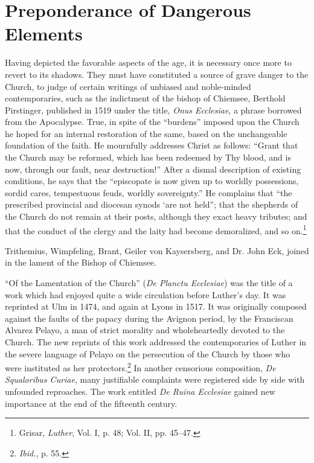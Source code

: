 \section{Preponderance of Dangerous Elements}

Having depicted the favorable aspects of the age, it is necessary
once more to revert to its shadows. They must have constituted a
source of grave danger to the Church, to judge of certain writings
of unbiased and noble-minded contemporaries, such as the indictment of
the bishop of Chiemsee, Berthold Pirstinger, published in
1519 under the title, \textit{Onus Ecclesiae}, a phrase borrowed from the
Apocalypse. True, in spite of the “burdens” imposed upon the Church
he hoped for an internal restoration of the same, based on the unchangeable
foundation of the faith. He mournfully addresses Christ
as follows: “Grant that the Church may be reformed, which has
been redeemed by Thy blood, and is now, through our fault, near
destruction!” After a dismal description of existing conditions, he
says that the “episcopate is now given up to worldly possessions,
sordid cares, tempestuous feuds, worldly sovereignty.” He complains
that “the prescribed provincial and diocesan synods ‘are not held”;
that the shepherds of the Church do not remain at their posts, although
they exact heavy tributes; and that the conduct of the clergy
and the laity had become demoralized, and so on.\footnote
{Grisar, \textit{Luther}, Vol. I, p. 48; Vol. II, pp. 45--47.}

Trithemius, Wimpfeling, Brant, Geiler von Kaysersberg, and Dr.
John Eck, joined in the lament of the Bishop of Chiemsee.

“Of the Lamentation of the Church” (\textit{De Planctu Ecclesiae})
was the title of a work which had enjoyed quite a wide circulation
before Luther’s day. It was reprinted at Ulm in 1474, and again at
Lyons in 1517. It was originally composed against the faults of
the papacy during the Avignon period, by the Franciscan Alvarez
Pelayo, a man of strict morality and wholeheartedly devoted to the
Church. The new reprints of this work addressed the contemporaries
of Luther in the severe language of Pelayo on the persecution of
the Church by those who were instituted as her protectors.\footnote{\textit{Ibid.}, p. 55.}
In another censorious composition, \textit{De Squaloribus Curiae}, many justifiable
complaints were registered side by side with unfounded reproaches. The
work entitled \textit{De Ruina Ecclesiae} gained new importance
at the end of the fifteenth century.


